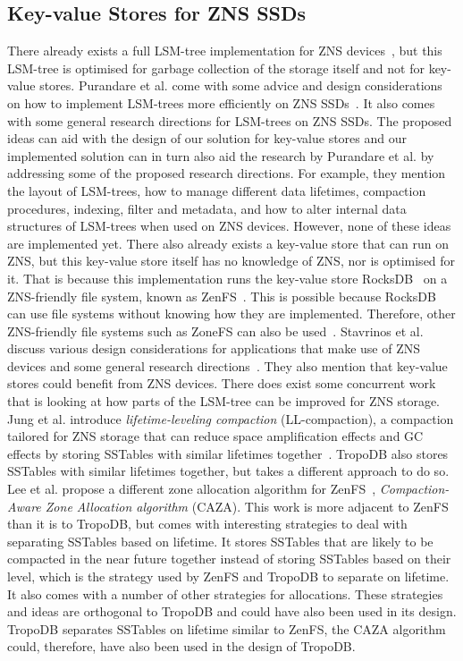 \subsection{Key-value Stores for ZNS SSDs}
There already exists a full LSM-tree implementation for ZNS devices~\cite{choi2020new}, but this LSM-tree is optimised for garbage collection of the storage itself and not for key-value stores. Purandare et al. come with some advice and design considerations on how to implement LSM-trees more efficiently on ZNS SSDs~\cite{purandareappend}. It also comes with some general research directions for LSM-trees on ZNS SSDs. The proposed ideas can aid with the design of our solution for key-value stores and our implemented solution can in turn also aid the research by Purandare et al. by addressing some of the proposed research directions. For example, they mention the layout of LSM-trees, how to manage different data lifetimes, compaction procedures, indexing, filter and metadata, and how to alter internal data structures of LSM-trees when used on ZNS devices. However, none of these ideas are implemented yet. There also already exists a key-value store that can run on ZNS, but this key-value store itself has no knowledge of ZNS, nor is optimised for it. That is because this implementation runs the key-value store RocksDB~\cite{RocksDB} on a ZNS-friendly file system, known as ZenFS~\cite{bjorling2021zns}. This is possible because RocksDB can use file systems without knowing how they are implemented. Therefore, other ZNS-friendly file systems such as ZoneFS can also be used~\cite{purandareappend,le2020zonefs}.  Stavrinos et al. discuss various design considerations for applications that make use of ZNS devices and some general research directions~\cite{stavrinos2021don}. They also mention that key-value stores could benefit from ZNS devices. There does exist some concurrent work that is looking at how parts of the LSM-tree can be improved for ZNS storage. Jung et al. introduce \textit{lifetime-leveling compaction} (LL-compaction), a compaction tailored for ZNS storage that can reduce space amplification effects and GC effects by storing SSTables with similar lifetimes together~\cite{jung2022lifetime}. TropoDB also stores SSTables with similar lifetimes together, but takes a different approach to do so. Lee et al. propose a different zone allocation algorithm for ZenFS~\cite{lee2022compaction}, \textit{Compaction-Aware Zone Allocation algorithm} (CAZA). This work is more adjacent to ZenFS than it is to TropoDB, but comes with interesting strategies to deal with separating SSTables based on lifetime. It stores SSTables that are likely to be compacted in the near future together instead of storing SSTables based on their level, which is the strategy used by ZenFS and TropoDB to separate on lifetime. It also comes with a number of other strategies for allocations. These strategies and ideas are orthogonal to TropoDB and could have also been used in its design. TropoDB separates SSTables on lifetime similar to ZenFS, the CAZA algorithm could, therefore, have also been used in the design of TropoDB.

